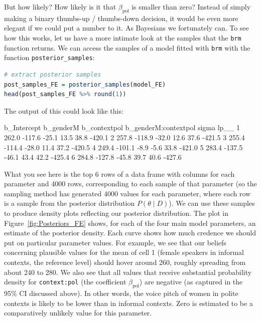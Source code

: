 \documentclass[nobib]{tufte-handout}
\begin{document}
But how likely? How likely is it that $\beta_{\text{pol}}$ is smaller than zero? Instead of simply making a binary thumbs-up / thumbs-down decision, it would be even more elegant if we could put a number to it. As Bayesians we fortunately can. To see how this works, let us have a more intimate look at the samples that the \texttt{brm} function returns. We can access the samples of a model fitted with \texttt{brm} with the function \texttt{posterior\_samples}:

\bigskip

\begin{minipage}[]{\textwidth}
\begin{lstlisting}[language=R]
# extract posterior samples 
post_samples_FE = posterior_samples(model_FE)
head(post_samples_FE %>% round(1))
\end{lstlisting}
\end{minipage}

The output of this could look like this:

\bigskip

\begin{minipage}[]{1.2\textwidth}
\begin{rc}
  b_Intercept b_genderM b_contextpol b_genderM:contextpol sigma   lp__
1       262.0    -117.6        -25.1                 13.5  38.8 -420.1
2       257.8    -118.9        -32.0                 12.6  37.6 -421.5
3       255.4    -114.4        -28.0                 11.4  37.2 -420.5
4       249.4    -101.1         -8.9                 -5.6  33.8 -421.0
5       283.4    -137.5        -46.1                 43.4  42.2 -425.4
6       284.8    -127.8        -45.8                 39.7  40.6 -427.6
\end{rc}
\end{minipage}

What you see here is the top 6 rows of a data frame with columns for each parameter and 4000 rows, corresponding to each sample of that parameter (so the sampling method has generated 4000 values for each parameter, where each row is a sample from the posterior distribution $P(\theta \mid D)$).
%
%
We can use these samples to produce density plots reflecting our posterior distribution. The plot in Figure~\ref{fig:Posteriors_FE}
shows, for each of the four main model parameters, an estimate of the posterior density. Each
curve shows how much credence we should put on particular parameter values. For example, we see
that our beliefs concerning plausible values for the mean of cell 1 (female speakers in informal
contexts, the reference level) should hover around 260, roughly spreading from about 240 to 280.
We also see that all values that receive substantial probability density for \texttt{context:pol} (the coefficient $\beta_{\text{pol}}$) are negative (as captured in the 95\% CI discussed above). In other words,  the voice pitch of women in polite contexts is likely to be lower than in informal contexts. Zero is estimated to be a comparatively unlikely value for this parameter.
\end{document}
